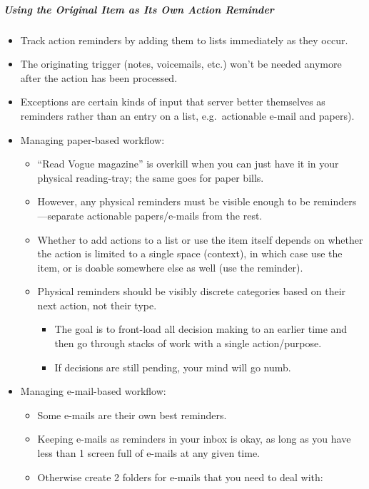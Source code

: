 \documentclass{article}
\begin{document}
\subparagraph{Using the Original Item as Its Own Action Reminder}

\begin{itemize}
  \item Track action reminders by adding them to lists immediately as they occur.
  \item The originating trigger (notes, voicemails, etc.) won't be needed anymore after the action has been processed.
  \item Exceptions are certain kinds of input that server better themselves as reminders rather than an entry on a list, e.g.\ actionable e-mail and papers).
  \item Managing paper-based workflow:
  \begin{itemize}
    \item ``Read Vogue magazine'' is overkill when you can just have it in your physical reading-tray; the same goes for paper bills.
    \item However, any physical reminders must be visible enough to be re\-min\-ders---separate actionable papers/e-mails from the rest.
    \item Whether to add actions to a list or use the item itself depends on whether the action is limited to a single space (context), in which case use the item, or is doable somewhere else as well (use the reminder).
    \item Physical reminders should be visibly discrete categories based on their next action, not their type.
    \begin{itemize}
      \item The goal is to front-load all decision making to an earlier time and then go through stacks of work with a single action/purpose.
      \item If decisions are still pending, your mind will go numb.
    \end{itemize}
  \end{itemize}
  \item Managing e-mail-based workflow:
  \begin{itemize}
    \item Some e-mails are their own best reminders.
    \item Keeping e-mails as reminders in your inbox is okay, as long as you have less than 1 screen full of e-mails at any given time.
    \item Otherwise create 2 folders for e-mails that you need to deal with:
    \begin{enumerate}

\end{enumerate}
\end{itemize}
\end{itemize}
\end{document}
